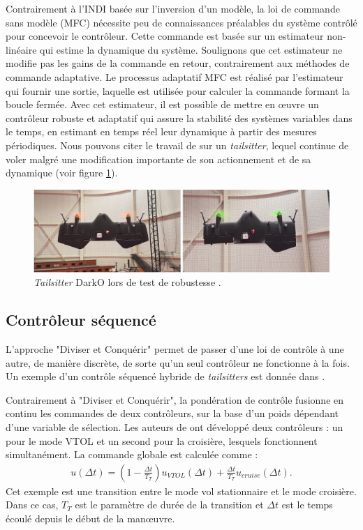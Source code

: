 Contrairement à l'INDI basée sur l'inversion d'un modèle, la loi de commande sans modèle (MFC) \cite{Fliess_2013}  nécessite peu de connaissances préalables du système contrôlé pour concevoir le contrôleur. Cette commande est basée sur un estimateur non-linéaire qui estime la dynamique du système. Soulignons que cet estimateur ne modifie pas les gains de la commande en retour, contrairement aux méthodes de commande adaptative. Le processus adaptatif MFC est réalisé par l'estimateur qui fournir une sortie, laquelle est utilisée pour calculer la commande formant la boucle fermée. Avec cet estimateur, il est possible de mettre en œuvre un contrôleur robuste et adaptatif qui assure la stabilité des systèmes variables dans le temps, en estimant en temps réel leur dynamique à partir des mesures périodiques. Nous pouvons citer le travail de \cite{olszaneckibarthHal-02542982} sur un \textit{tailsitter}, lequel continue de voler malgré une modification importante de son actionnement et de sa dynamique (voir figure \ref{fig:darko_mfc}).

\begin{figure}[ht!]
    \centerline{
    \includegraphics[trim=0cm 0cm 0cm 0cm,clip,width=0.5\columnwidth]{figures/darko_MFC.png}}
    \caption{\textit{Tailsitter} DarkO lors de test de robustesse \cite{olszaneckibarthHal-02542982}.}
    \label{fig:darko_mfc}
\end{figure}



\subsection*{Contrôleur séquencé}
L'approche "Diviser et Conquérir" permet de passer d'une loi de contrôle à une autre, de manière discrète, de sorte qu'un seul contrôleur ne fonctionne à la fois. Un exemple d'un contrôle séquencé hybride de \textit{tailsitters} est donnée dans \cite{Casau2011}.

Contrairement à "Diviser et Conquérir", la pondération de contrôle fusionne en continu les commandes de deux contrôleurs, sur la base d'un poids dépendant d'une variable de sélection. Les auteurs de \cite{Liang2016} ont développé deux contrôleurs : un pour le mode VTOL et un second pour la croisière, lesquels fonctionnent simultanément. La commande globale est calculée comme  :
\begin{align*}
    u(\Delta t) = (1 - \frac{\Delta t}{T_{T}})u_{VTOL}(\Delta t) + \frac{\Delta t}{T_{T}}u_{cruise}(\Delta t).
\end{align*}
Cet exemple est une transition entre le mode vol stationnaire et le mode croisière. Dans ce cas, $T_{T}$ est le paramètre de durée de la transition et $\Delta t$ est le temps écoulé depuis le début de la manœuvre.

